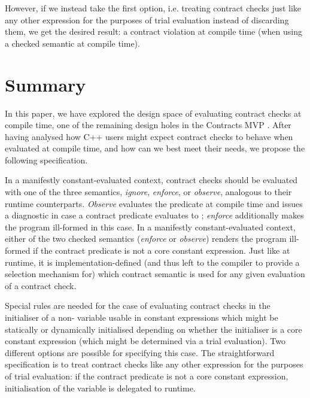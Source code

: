 However, if we instead take the first option, i.e. treating contract checks just like any other expression for the purposes of trial evaluation instead of discarding them, we get the desired result: a contract violation at compile time (when using a checked semantic at compile time).

\section{Summary}

In this paper, we have explored the design space of evaluating contract checks at compile time, one of the remaining design holes in the Contracts MVP \cite{P2900R1}. After having analysed how C++ users might expect contract checks to behave when evaluated at compile time, and how can we best meet their needs, we propose the following specification.

In a manifestly constant-evaluated context, contract checks should be evaluated with one of the three semantics, \emph{ignore}, \emph{enforce}, or \emph{observe}, analogous to their runtime counterparts. \emph{Observe} evaluates the predicate at compile time and issues a diagnostic in case a contract predicate evaluates to ; \emph{enforce} additionally makes the program ill-formed in this case. In a manifestly constant-evaluated context, either of the two checked semantics (\emph{enforce} or \emph{observe}) renders the program ill-formed if the contract predicate is not a core constant expression. Just like at runtime, it is implementation-defined (and thus left to the compiler to provide a selection mechanism for) which contract semantic is used for any given evaluation of a contract check.

Special rules are needed for the case of evaluating contract checks in the initialiser of a non- variable usable in constant expressions which might be statically or dynamically initialised depending on whether the initialiser is a core constant expression (which might be determined via a trial evaluation). Two different options are possible for specifying this case. The straightforward specification is to treat contract checks like any other expression for the purposes of trial  evaluation: if the contract predicate is not a core constant expression, initialisation of the variable is delegated to runtime.


